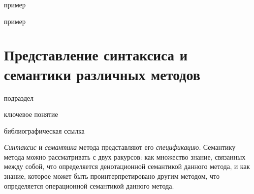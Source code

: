 \begin{SCn}
\begin{scnindent}
    \begin{scnhaselementrolelist}{пример}
    \end{scnhaselementrolelist}
\end{scnindent}
\begin{scnindent}
    \begin{scnhaselementrolelist}{пример}
    \end{scnhaselementrolelist}
\end{scnindent}
\end{SCn}

\section{Представление синтаксиса и семантики различных методов}
\label{sec_programs_method_syntax_and_semantic}

\begin{SCn}
	
\begin{scnrelfromlist}{подраздел}
\end{scnrelfromlist}

\bigskip

\begin{scnrelfromlist}{ключевое понятие}
	\scnitem{***}
\end{scnrelfromlist}

\bigskip

\begin{scnrelfromlist}{библиографическая ссылка}
	\scnitem{***}
\end{scnrelfromlist}
	
\end{SCn}

\textit{Синтаксис} и \textit{семантика} метода представляют его \textit{спецификацию}. Семантику метода можно рассматривать с двух ракурсов: как множество знание, связанных между собой, что определяется денотационной семантикой данного метода, и как знание, которое может быть проинтерпретировано другим методом, что определяется операционной семантикой данного метода.

